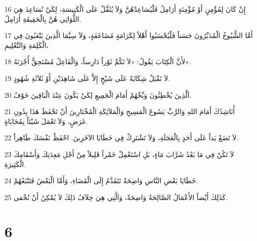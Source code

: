 \par 16 إِنْ كَانَ لِمُؤْمِنٍ أَوْ مُؤْمِنَةٍ أَرَامِلُ فَلْيُسَاعِدْهُنَّ وَلاَ يُثَقَّلْ عَلَى الْكَنِيسَةِ، لِكَيْ تُسَاعِدَ هِيَ اللَّوَاتِي هُنَّ بِالْحَقِيقَةِ أَرَامِلُ.
\par 17 أَمَّا الشُّيُوخُ الْمُدَبِّرُونَ حَسَناً فَلْيُحْسَبُوا أَهْلاً لِكَرَامَةٍ مُضَاعَفَةٍ، وَلاَ سِيَّمَا الَّذِينَ يَتْعَبُونَ فِي الْكَلِمَةِ وَالتَّعْلِيمِ،
\par 18 لأَنَّ الْكِتَابَ يَقُولُ: «لاَ تَكُمَّ ثَوْراً دَارِساً، وَالْفَاعِلُ مُسْتَحِقٌّ أُجْرَتَهُ».
\par 19 لاَ تَقْبَلْ شِكَايَةً عَلَى شَيْخٍ إِلاَّ عَلَى شَاهِدَيْنِ أَوْ ثَلاَثَةِ شُهُودٍ.
\par 20 اَلَّذِينَ يُخْطِئُونَ وَبِّخْهُمْ أَمَامَ الْجَمِيعِ لِكَيْ يَكُونَ عِنْدَ الْبَاقِينَ خَوْفٌ.
\par 21 أُنَاشِدُكَ أَمَامَ اللهِ وَالرَّبِّ يَسُوعَ الْمَسِيحِ وَالْمَلاَئِكَةِ الْمُخْتَارِينَ أَنْ تَحْفَظَ هَذَا بِدُونِ غَرَضٍ، وَلاَ تَعْمَلَ شَيْئاً بِمُحَابَاةٍ.
\par 22 لاَ تَضَعْ يَداً عَلَى أَحَدٍ بِالْعَجَلَةِ، وَلاَ تَشْتَرِكْ فِي خَطَايَا الآخَرِينَ. احْفَظْ نَفْسَكَ طَاهِراً.
\par 23 لاَ تَكُنْ فِي مَا بَعْدُ شَرَّابَ مَاءٍ، بَلِ اسْتَعْمِلْ خَمْراً قَلِيلاً مِنْ أَجْلِ مَعِدَتِكَ وَأَسْقَامِكَ الْكَثِيرَةِ.
\par 24 خَطَايَا بَعْضِ النَّاسِ وَاضِحَةٌ تَتَقَدَّمُ إِلَى الْقَضَاءِ، وَأَمَّا الْبَعْضُ فَتَتْبَعُهُمْ.
\par 25 كَذَلِكَ أَيْضاً الأَعْمَالُ الصَّالِحَةُ وَاضِحَةٌ، وَالَّتِي هِيَ خِلاَفُ ذَلِكَ لاَ يُمْكِنُ أَنْ تُخْفى.

\chapter{6}

